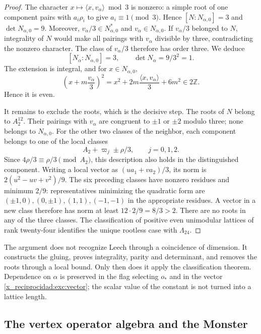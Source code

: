\begin{proof}
The character $x\mapsto\langle x,v_\alpha\rangle\bmod3$ is nonzero:
a simple root of one component pairs with $a_i\rho_i$ to give
$a_i\equiv1\pmod3$. Hence $[N:N_{\alpha,0}]=3$ and
$\det N_{\alpha,0}=9$. Moreover,
$v_\alpha/3\in N_{\alpha,0}^*$ and $v_\alpha\in N_{\alpha,0}$.
If $v_\alpha/3$ belonged to $N$, integrality of $N$ would make
all pairings with $v_\alpha$ divisible by three,
contradicting the nonzero character. The class of $v_\alpha/3$ therefore has
order three. We deduce
\[
 [N_\alpha:N_{\alpha,0}]=3,
 \qquad \det N_\alpha=9/3^2=1.
\]
The extension is integral, and for $x\in N_{\alpha,0}$,
\[
 \left(x+m\frac{v_\alpha}{3}\right)^2
   =x^2+2m\frac{\langle x,v_\alpha\rangle}{3}+6m^2
   \in2\mathbb Z.
\]
Hence it is even.

It remains to exclude the roots, which is the decisive step. The roots of $N$
belong to $A_2^{12}$. Their pairings with $v_\alpha$ are
congruent to $\pm1$ or $\pm2$ modulo three; none belongs to
$N_{\alpha,0}$. For the other two classes of the neighbor, each component
belongs to one of the local classes
\[
 A_2+\varpi_j\pm\rho/3,\qquad j=0,1,2.
\]
Since $4\rho/3\equiv\rho/3\pmod{A_2}$, this description also holds
in the distinguished component. Writing a local vector
as $(u a_1+v a_2)/3$, its norm is
$2(u^2-uv+v^2)/9$. The six preceding classes have nonzero residues
and minimum $2/9$: representatives minimizing the quadratic form
are $(\pm1,0),(0,\pm1),(1,1),(-1,-1)$ in the appropriate residues.
A vector in a new class therefore has norm at least
$12\cdot2/9=8/3>2$. There are no roots in any of the three classes.
The classification of positive even unimodular lattices of
rank twenty-four identifies the unique rootless case with
$\Lambda_{24}$.
\end{proof}

The argument does not recognize Leech through a coincidence of dimension.
It constructs the gluing, proves integrality, parity and determinant, and
removes the roots through a local bound. Only then does it apply the
classification theorem. Dependence on $\alpha$ is preserved in
the flag selecting $o_*$ and in the vector \eqref{x_reciprocidad:exc:vector};
the scalar value of the constant is not turned into a lattice
length.

\subsection{The vertex operator algebra and the Monster}
\label{x_reciprocidad:exc:voa}

